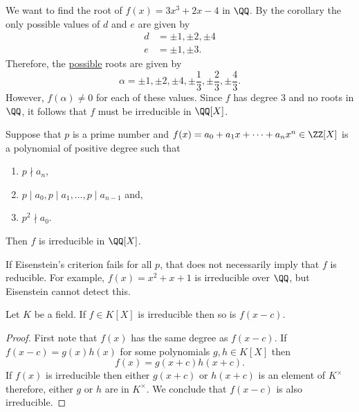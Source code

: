 \documentclass[12pt, a4paper]{article}
\begin{document}
\begin{mdexample}
    We want to find the root of \(f(x)=3x^3 +2x -4\) in \(\QQ\). By the corollary the only possible values of \(d\) and \(e\) are given by 
    \[\begin{aligned}
        d&=\pm 1,\pm 2,\pm 4 \\
        e&=\pm 1, \pm 3.
    \end{aligned}\]
    Therefore, the \ul{possible} roots are given by 
    \[\alpha = \pm 1,\pm 2, \pm 4,\pm \frac{1}{3},\pm \frac{2}{3},\pm \frac{4}{3}.\]
    However, \(f(\alpha) \neq 0\) for each of these values. Since \(f\) has degree \(3\) and no roots in \(\QQ\), it follows that \(f\) must be irreducible in \(\QQ[X]\).
\end{mdexample}

\begin{mdprop}
    Suppose that \(p\) is a prime number and \(f(x)=a_0+a_1x+\cdots+a_n x^n \in \ZZ[X]\) is a polynomial of positive degree such that 
    \begin{enumerate}
        \item \(p \nmid a_n\),
        \item \(p\mid a_0,p\mid a_1,\ldots, p\mid a_{n-1}\) and,
        \item \(p^2 \nmid a_0\).
    \end{enumerate}
    Then \(f\) is irreducible in \(\QQ[X]\).
\end{mdprop}

\begin{mdremark}
    If Eisenstein's criterion fails for all \(p\), that does not necessarily imply that \(f\) is reducible. For example, \(f(x)=x^2+x+1\) is irreducible over \(\QQ\), but Eisenstein cannot detect this.
\end{mdremark}

\begin{mdprop}
    Let \(K\) be a field. If \(f\in K[X]\) is irreducible then so is \(f(x-c)\).
\end{mdprop}

\begin{proof}
    First note that \(f(x)\) has the same degree as \(f(x-c)\). If \(f(x-c)=g(x)h(x)\) for some polynomials \(g,h\in K[X]\) then 
    \[f(x)=g(x+c)h(x+c).\]
    If \(f(x)\) is irreducible then either \(g(x+c)\) or \(h(x+c)\) is an element of \(K^{\times}\) therefore, either \(g\) or \(h\) are in \(K^{\times}\). We conclude that \(f(x-c)\) is also irreducible.
\end{proof}
\end{document}
